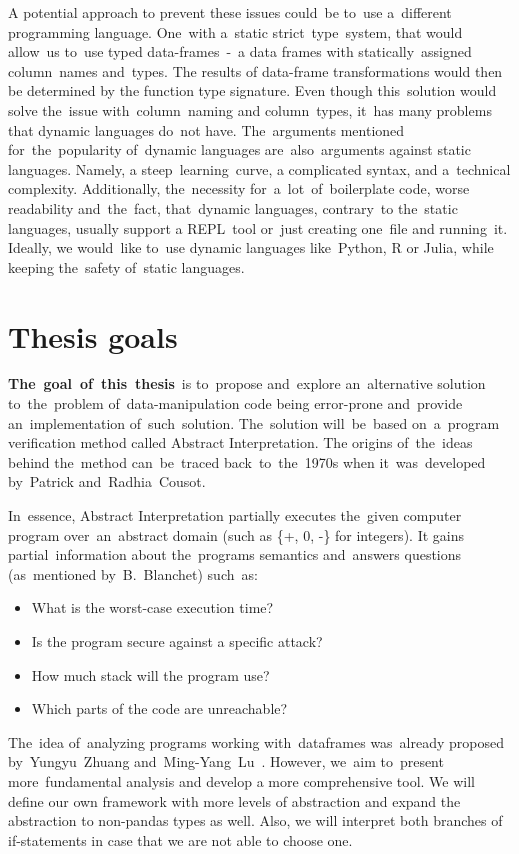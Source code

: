 A potential approach to prevent these issues could~be to~use a~different programming language.
One~with a~static strict~type~system, that would allow~us to~use typed data-frames~-~a data frames with statically~assigned
column~names and~types.
The results of data-frame transformations would then be determined by the function type signature.
Even though this~solution would solve the~issue with~column~naming and column~types, it~has many problems that dynamic
languages do~not have.
The~arguments mentioned for~the~popularity of~dynamic languages are~also~arguments against static languages.
Namely, a steep~learning~curve, a complicated syntax, and a~technical complexity.
Additionally, the~necessity for~a~lot~of~boilerplate code, worse readability and~the~fact, that~dynamic languages,
contrary~to the~static languages, usually support a REPL~tool or~just creating one~file and running~it.
Ideally, we would~like to~use dynamic languages like~Python, R or Julia, while keeping the~safety of~static languages.

\section*{Thesis goals}
\textbf{The~goal~of~this~thesis}~is to~propose and~explore an~alternative solution to~the~problem of~data-manipulation
code being error-prone and~provide an~implementation of~such~solution.
The~solution will~be~based on~a~program verification method called Abstract Interpretation.
The origins of~the~ideas behind the~method can~be~traced back~to~the~1970s when it~was~developed by~Patrick
and~Radhia~Cousot\cite{Cousot:1977:AI}.

In~essence, Abstract Interpretation partially executes the~given computer program over~an~abstract domain
(such as \{+, 0, -\} for integers).
It gains partial~information about the~programs semantics and~answers questions (as~mentioned
by~B.~Blanchet\cite{Blanchet:2002:AI}) such~as:
\begin{itemize}
    \item What is the worst-case execution time?
    \item Is the program secure against a specific attack?
    \item How much stack will the program use?
    \item Which parts of the code are unreachable?
\end{itemize}

The~idea of~analyzing programs working with~dataframes was~already proposed by~Yungyu~Zhuang
and~Ming-Yang~Lu~\cite{Zhuang:2022:TypeChecking}.
However, we~aim to~present more~fundamental analysis and develop a more comprehensive tool.
We will define our own framework with more levels of abstraction and expand the abstraction to non-pandas types as well.
Also, we will interpret both branches of if-statements in case that we are not able to choose one.

